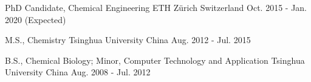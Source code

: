 

\begin{cventries}
\cventry
{PhD Candidate, Chemical Engineering} %
{ETH Z\"{u}rich} %
{Switzerland} %
{Oct. 2015 - Jan. 2020 (Expected)} %
{
}

\cventry
{M.S., Chemistry} %
{Tsinghua University} %
{China} %
{Aug. 2012 - Jul. 2015} %
{
}


\cventry
{B.S., Chemical Biology; Minor, Computer Technology and Application} %
{Tsinghua University} %
{China} %
{Aug. 2008 - Jul. 2012} %
{
}
   
\end{cventries}

